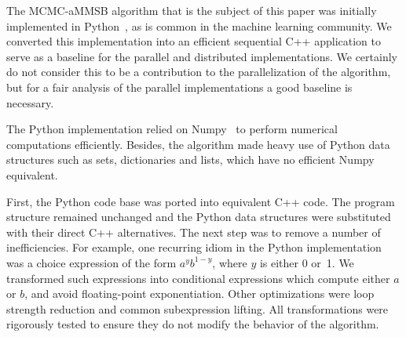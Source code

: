 The MCMC-aMMSB algorithm that is the subject of this paper was initially
implemented in Python~\cite{LiAW15}, as is common
in the machine learning community.
We converted this implementation into an efficient sequential C++ application
to serve as a baseline for the parallel and distributed implementations.
We certainly do not consider this to be a contribution to the parallelization
of the algorithm, but for a fair analysis of the parallel implementations
a good baseline is necessary.

The Python implementation
relied on Numpy~\cite{numpy} to perform numerical computations efficiently.
Besides, the algorithm
made heavy use of Python data structures such as sets, dictionaries and
lists, which have no efficient Numpy equivalent.

First, the Python code base was ported into equivalent C++ code.
The program structure remained unchanged and the Python data structures were
substituted with their direct C++ alternatives.
%
The next step was to remove a number of inefficiencies.
For example, one recurring idiom in the Python implementation
was a choice expression of the form $a^y b^{1-y}$, where $y$ is either 0 or~1.
We transformed such expressions into conditional expressions which
compute either $a$ or $b$, and avoid floating-point exponentiation.
%
Other optimizations were loop strength
reduction and common subexpression lifting.
%
All transformations were rigorously tested to ensure they do
not modify the behavior of the algorithm.
%
\begin{comment}
Further, we replaced calls to the system's random
functions with a custom implementation of the random generator
\textit{xorshift\_128}~\cite{Marsaglia:2003:XR}. This way, random calls no longer
involve system calls, so we can support easy and fast multi-threaded random
calls by providing each thread with its private, differently seeded, random
generator.
\end{comment}
